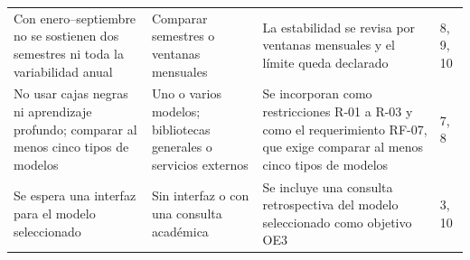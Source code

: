 \begin{longtable}{>{\raggedright\arraybackslash}p{3.6cm}>{\raggedright\arraybackslash}p{3.6cm}>{\raggedright\arraybackslash}p{5.0cm}p{1.6cm}}
Con enero--septiembre no se sostienen dos semestres ni toda la variabilidad anual & Comparar semestres o ventanas mensuales & La estabilidad se revisa por ventanas mensuales y el límite queda declarado & 8, 9, 10 \\
No usar cajas negras ni aprendizaje profundo; comparar al menos cinco tipos de modelos & Uno o varios modelos; bibliotecas generales o servicios externos & Se incorporan como restricciones R-01 a R-03 y como el requerimiento RF-07, que exige comparar al menos cinco tipos de modelos & 7, 8 \\
Se espera una interfaz para el modelo seleccionado & Sin interfaz o con una consulta académica & Se incluye una consulta retrospectiva del modelo seleccionado como objetivo OE3 & 3, 10 \\
\end{longtable}
